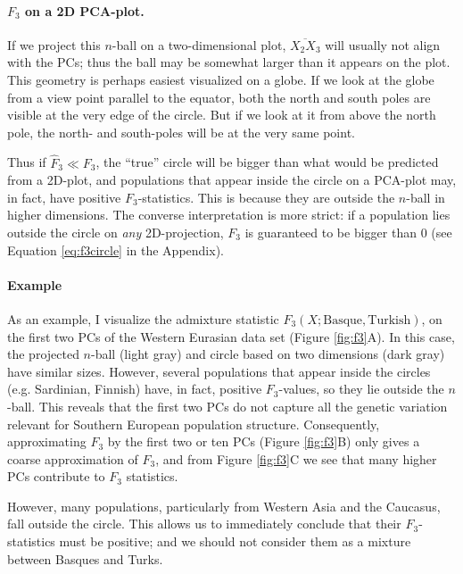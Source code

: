 \documentclass[12pt,fullpage, a4paper]{article}
\begin{document}
\paragraph{$F_3$ on a 2D PCA-plot.} 
 If we project this $n$-ball on a two-dimensional plot, $\overline{X_2X_3}$ will usually not align with the PCs; thus the ball may be somewhat larger than it appears on the plot. This geometry is perhaps easiest visualized on a globe. If we look at the globe from a view point parallel to the equator, both the north and south poles are visible at the very edge of the circle. But if we look at it from above the north pole, the north- and south-poles will be at the very same point.
 
 Thus if $\hat{F}_3 \ll F_3$, the ``true'' circle will be bigger than what would be predicted from a 2D-plot, and populations that appear inside the circle on a PCA-plot may, in fact, have positive $F_3$-statistics. This is because they are outside the $n$-ball in higher dimensions. The converse interpretation is more strict: if a population lies outside the circle on \emph{any} 2D-projection, $F_3$ is guaranteed to be bigger than 0 (see Equation \ref{eq:f3circle} in the Appendix).

\paragraph{Example}
As an example, I visualize the admixture statistic $F_3(X; \text{Basque}, \text{Turkish})$, on the first two PCs of the Western Eurasian data set (Figure \ref{fig:f3}A). In this case, the projected $n$-ball (light gray) and circle based on two dimensions (dark gray) have similar sizes. However, several populations that appear inside the circles (e.g. Sardinian, Finnish) have, in fact, positive $F_3$-values, so they lie outside the $n$-ball. This reveals that the first two PCs do not capture all the genetic variation relevant for Southern European population structure.  Consequently, approximating $F_3$ by the first two or ten PCs (Figure \ref{fig:f3}B) only gives a coarse approximation of $F_3$, and from Figure \ref{fig:f3}C we see that many higher PCs contribute to $F_3$ statistics.

However, many populations, particularly from Western Asia and the Caucasus, fall outside the circle. This allows us to immediately conclude that their $F_3$-statistics must be positive; and we should not consider them as a mixture between Basques and Turks.
\end{document}
